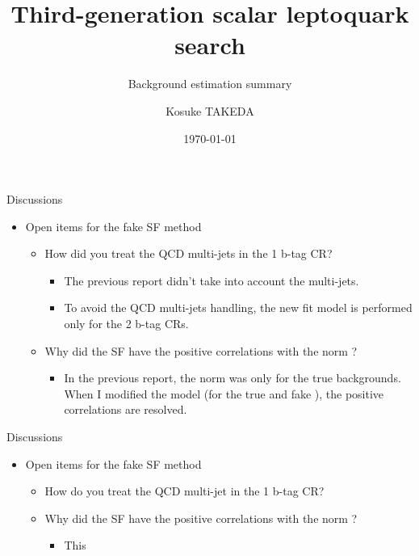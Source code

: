 \documentclass[aspectratio=46, 10pt, t]{beamer} %
\title{Third-generation scalar leptoquark search}
\subtitle{Background estimation summary}
\author{Kosuke TAKEDA}
\institute{Kobe University}
\date{\today}
\begin{document}
\frame[plain]{\titlepage}



\begin{frame}{Discussions}
  \begin{itemize}
    \item Open items for the \ttbar fake SF method
      \begin{itemize}
        \item How did you treat the QCD multi-jets in the 1 b-tag CR?
          \begin{itemize}
            \item The previous report didn't take into account the multi-jets.
            \item To avoid the QCD multi-jets handling, the new fit model is performed only for the 2 b-tag CRs.
          \end{itemize}
        \item Why did the SF have the positive correlations with the \ttbar norm ? 
          \begin{itemize}
            \item In the previous report, the \ttbar norm was only for the true \ttbar backgrounds. 
              When I modified the model (\ttbar for the true and fake \ttbar), the positive correlations are resolved.
          \end{itemize}
      \end{itemize}

  \end{itemize}
\end{frame}

\begin{frame}{Discussions}
  \begin{itemize}
    \item Open items for the \ttbar fake SF method
      \begin{itemize}
        \item How do you treat the QCD multi-jet in the 1 b-tag CR?
        \item Why did the SF have the positive correlations with the \ttbar norm ? 
          \begin{itemize}
            \item This 
          \end{itemize}
      \end{itemize}
  \end{itemize}
\end{frame}
\end{document}

